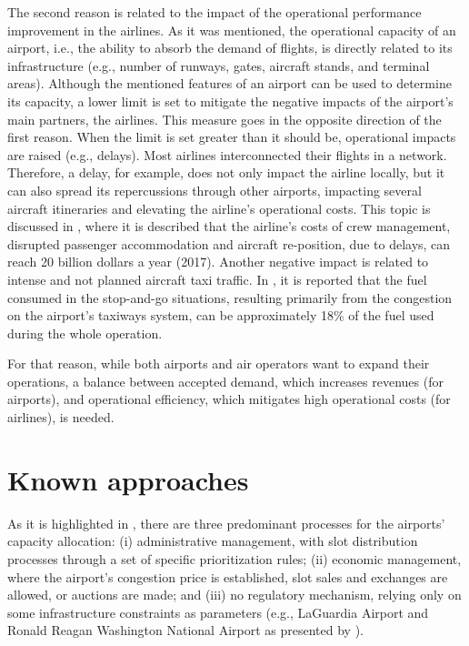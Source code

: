 The second reason is related to the impact of the operational performance improvement in the airlines. As it was mentioned, the operational capacity of an airport, i.e., the ability to absorb the demand of flights, is directly related to its infrastructure (e.g., number of runways, gates, aircraft stands, and terminal areas). Although the mentioned features of an airport can be used to determine its capacity, a lower limit is set to mitigate the negative impacts of the airport’s main partners, the airlines. This measure goes in the opposite direction of the first reason. When the limit is set greater than it should be, operational impacts are raised (e.g., delays). Most airlines interconnected their flights in a network. Therefore, a delay, for example, does not only impact the airline locally, but it can also spread its repercussions through other airports, impacting several aircraft itineraries and elevating the airline’s operational costs. This topic is discussed in \cite{ball2010total}, where it is described that the airline's costs of crew management, disrupted passenger accommodation and aircraft re-position, due to delays, can reach 20 billion dollars a year (2017). Another negative impact is related to intense and not planned aircraft taxi traffic. In \cite{nikoleris2011detailed}, it is reported that the fuel consumed in the stop-and-go situations, resulting primarily from the congestion on the airport’s taxiways system, can be approximately 18\% of the fuel used during the whole operation.

For that reason, while both airports and air operators want to expand their operations, a balance between accepted demand, which increases revenues (for airports), and operational efficiency, which mitigates high operational costs (for airlines), is needed.

\section{Known approaches}
\label{appr}

As it is highlighted in \cite{cavusoglu2021minimum}, there are three predominant processes for the airports’ capacity allocation: (i) administrative management, with slot distribution processes through a set of specific prioritization rules; (ii) economic management, where the airport’s congestion price is established, slot sales and exchanges are allowed, or auctions are made; and (iii) no regulatory mechanism, relying only on some infrastructure constraints as parameters (e.g., LaGuardia Airport and Ronald Reagan Washington National Airport as presented by \cite{FAAslots}).

